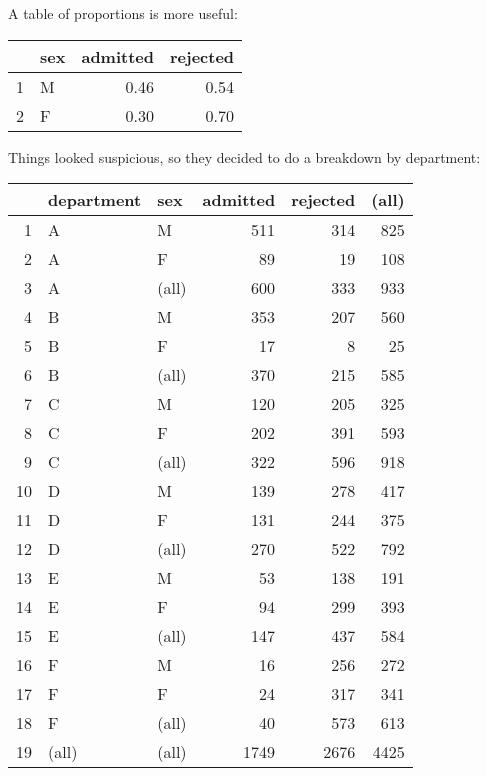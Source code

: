 \documentclass[landscape]{exam}
\begin{document}
  A table of proportions is more useful:
  \begin{table}[H]
    \centering
    \begin{tabular}{rlrr}
      \toprule
                & sex & admitted & rejected \\
      \midrule
      1         & M   & 0.46     & 0.54 \\
      2         & F   & 0.30     & 0.70 \\
       \bottomrule
    \end{tabular}
  \end{table}

  Things looked suspicious, so they decided to do a breakdown by department:

  \begin{table}[H]
    \centering
    \begin{tabular}{rllrrr}
      \toprule
                 & department & sex   & admitted & rejected & (all) \\
      \midrule
      1          & A          & M     & 511      & 314      & 825 \\
      2          & A          & F     & 89       & 19       & 108 \\
      3          & A          & (all) & 600      & 333      & 933 \\
      \midrule
      4          & B          & M     & 353      & 207      & 560 \\
      5          & B          & F     & 17       & 8        & 25 \\
      6          & B          & (all) & 370      & 215      & 585 \\
      \midrule
      7          & C          & M     & 120      & 205      & 325 \\
      8          & C          & F     & 202      & 391      & 593 \\
      9          & C          & (all) & 322      & 596      & 918 \\
      \midrule
      10         & D          & M     & 139      & 278      & 417 \\
      11         & D          & F     & 131      & 244      & 375 \\
      12         & D          & (all) & 270      & 522      & 792 \\
      \midrule
      13         & E          & M     & 53       & 138      & 191 \\
      14         & E          & F     & 94       & 299      & 393 \\
      15         & E          & (all) & 147      & 437      & 584 \\
      \midrule
      16         & F          & M     & 16       & 256      & 272 \\
      17         & F          & F     & 24       & 317      & 341 \\
      18         & F          & (all) & 40       & 573      & 613 \\
      \midrule
      19         & (all)      & (all) & 1749     & 2676     & 4425 \\
      \bottomrule
    \end{tabular}
  \end{table}
\end{document}
